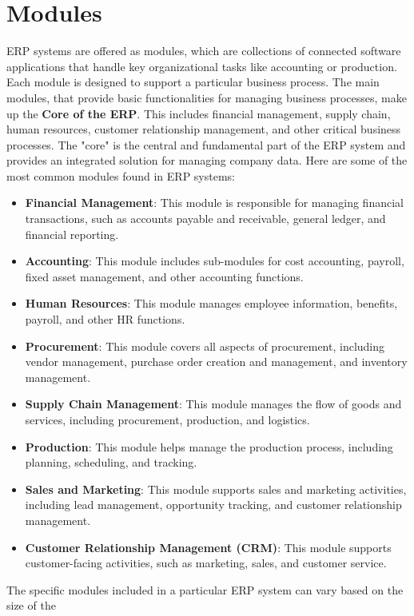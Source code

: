 \section{Modules}
ERP systems are offered as modules, which are collections of connected software applications that handle key organizational tasks like accounting or production. Each module is designed to support a particular business process.
The main modules, that provide basic functionalities for managing business processes, make up the \textbf{Core of the ERP}. This includes financial management, supply chain, human resources, customer relationship management, and other critical business processes. The "core" is the central and fundamental part of the ERP system and provides an integrated solution for managing company data.
Here are some of the most common modules found in ERP systems:
\begin{itemize}
    \item \textbf{Financial Management}: This module is responsible for managing financial transactions, such as accounts payable and receivable, general ledger, and financial reporting.
    \item \textbf{Accounting}: This module includes sub-modules for cost accounting, payroll, fixed asset management, and other accounting functions.
    \item \textbf{Human Resources}: This module manages employee information, benefits, payroll, and other HR functions.
    \item \textbf{Procurement}: This module covers all aspects of procurement, including vendor management, purchase order creation and management, and inventory management.
    \item \textbf{Supply Chain Management}: This module manages the flow of goods and services, including procurement, production, and logistics.
    \item \textbf{Production}: This module helps manage the production process, including planning, scheduling, and tracking.
    \item \textbf{Sales and Marketing}: This module supports sales and marketing activities, including lead management, opportunity tracking, and customer relationship management.
    \item \textbf{Customer Relationship Management (CRM)}: This module supports customer-facing activities, such as marketing, sales, and customer service.
\end{itemize}
The specific modules included in a particular ERP system can vary based on the size of the
